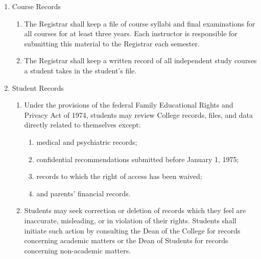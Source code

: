 \documentclass{manual}
\newcommand{\itemLevelA}{\alph*.}
\newcommand{\itemLevelB}{\arabic*)}
\newcommand{\itemRefA}{\alph*}
\newcommand{\itemRefB}{\arabic*}
\begin{document}
\begin{enumerate}[label=\itemLevelA,ref=\itemRefA]

\item Course Records

\begin{enumerate}[label=\itemLevelB,ref=\itemRefB]

\item The Registrar shall keep a file of course syllabi  and final examinations for all courses for at least three years. Each instructor is responsible for submitting this material to the Registrar each semester.


\item The Registrar  shall keep a written record of all independent study courses a student takes in the student's file.

\end{enumerate}



\item Student Records

\begin{enumerate}[label=\itemLevelB,ref=\itemRefB]

\item Under the provisions of the federal Family Educational Rights and Privacy Act of 1974, students may review College records, files, and data directly related to themselves except: 

\begin{enumerate}[label=\alph*)]

\item medical and psychiatric records; 

\item confidential recommendations submitted before January 1, 1975;


\item records to which the right of access has been waived; 


\item and parents' financial records.
\end{enumerate}

\item Students may seek correction or deletion of records which they feel are inaccurate, misleading, or in violation of their rights. Students shall initiate such action by consulting the Dean of the College for records concerning academic matters or the Dean of Students for records concerning non-academic matters.


\end{enumerate}
\end{enumerate}
\end{document}
